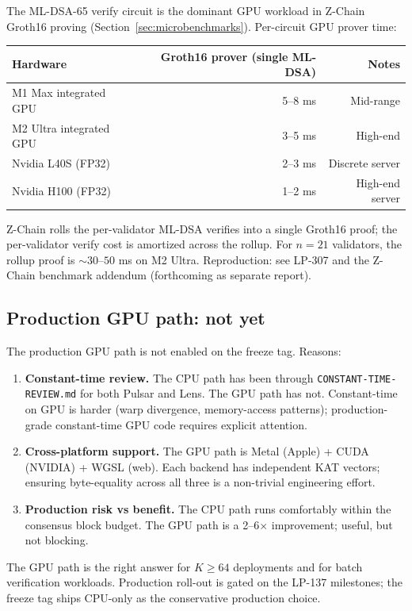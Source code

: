 The ML-DSA-65 verify circuit is the dominant GPU workload in Z-Chain Groth16 proving (Section~\ref{sec:microbenchmarks}). Per-circuit GPU prover time:

\begin{tabular}{@{}lrr@{}}
  \toprule
  \textbf{Hardware} & \textbf{Groth16 prover (single ML-DSA)} & \textbf{Notes} \\
  \midrule
  M1 Max integrated GPU & 5--8 ms & Mid-range \\
  M2 Ultra integrated GPU & 3--5 ms & High-end \\
  Nvidia L40S (FP32) & 2--3 ms & Discrete server \\
  Nvidia H100 (FP32) & 1--2 ms & High-end server \\
  \bottomrule
\end{tabular}

Z-Chain rolls the per-validator ML-DSA verifies into a single Groth16 proof; the per-validator verify cost is amortized across the rollup. For $n = 21$ validators, the rollup proof is $\sim 30$--$50$ ms on M2 Ultra. Reproduction: see LP-307 \cite{lp307} and the Z-Chain benchmark addendum (forthcoming as separate report).

\subsection{Production GPU path: not yet}

The production GPU path is not enabled on the freeze tag. Reasons:

\begin{enumerate}[leftmargin=2em,nosep]
  \item \textbf{Constant-time review.} The CPU path has been through \texttt{CONSTANT-TIME-REVIEW.md} for both Pulsar and Lens. The GPU path has not. Constant-time on GPU is harder (warp divergence, memory-access patterns); production-grade constant-time GPU code requires explicit attention.
  \item \textbf{Cross-platform support.} The GPU path is Metal (Apple) + CUDA (NVIDIA) + WGSL (web). Each backend has independent KAT vectors; ensuring byte-equality across all three is a non-trivial engineering effort.
  \item \textbf{Production risk vs benefit.} The CPU path runs comfortably within the consensus block budget. The GPU path is a 2--6$\times$ improvement; useful, but not blocking.
\end{enumerate}

The GPU path is the right answer for $K \geq 64$ deployments and for batch verification workloads. Production roll-out is gated on the LP-137 \cite{lp137} milestones; the freeze tag ships CPU-only as the conservative production choice.

